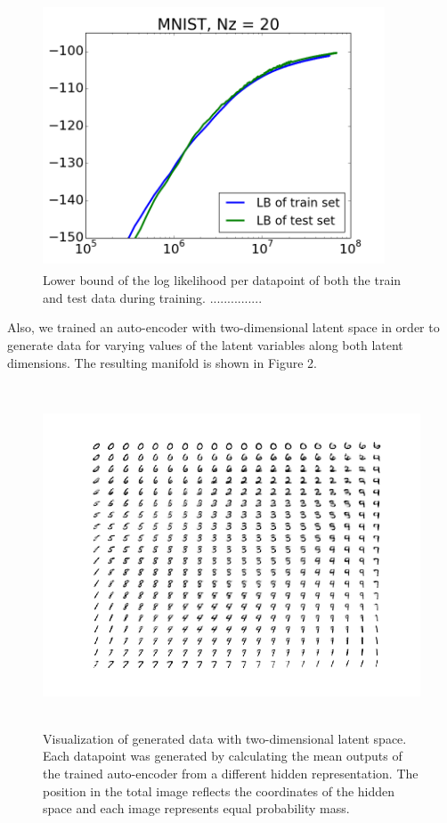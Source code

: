 \documentclass{article}
\begin{document}
\begin{figure}[htb]
\begin{center}
\includegraphics[height=3.1in,width=4in]{lowerboundAEVBMNIST.png}
\caption{Lower bound of the log likelihood per datapoint of both the train and test data during training. ...............}
\end{center}
\end{figure}

Also, we trained an auto-encoder with two-dimensional latent space in order to generate data for varying values of the latent variables along both latent dimensions. The resulting manifold is shown in Figure 2.

\begin{figure}[htb]
\begin{center}
\includegraphics[height=4in,width=5in]{manifoldMNIST.png}
\caption{Visualization of generated data with two-dimensional latent space. Each datapoint was generated by calculating the mean outputs of the trained auto-encoder from a different hidden representation. The position in the total image reflects the coordinates of the hidden space and each image represents equal probability mass.}
\end{center}
\end{figure}
\end{document}
